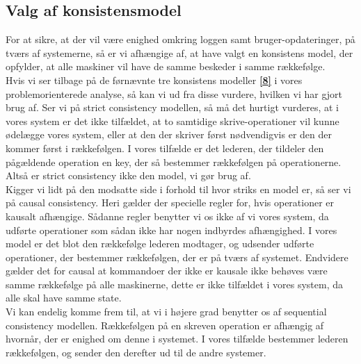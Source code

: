 \documentclass[a4paper,12pt]{article}
\begin{document}
\subsection{Valg af konsistensmodel}
For at sikre, at der vil være enighed omkring loggen samt bruger-opdateringer, på tværs af systemerne, så er vi afhængige af, at have valgt en konsistens model, der opfylder, at alle maskiner vil have de samme beskeder i samme rækkefølge.
\\[5px]
Hvis vi ser tilbage på de førnævnte tre konsistens modeller \hyperref[otte]{\textbf{[8]}} i vores problemorienterede analyse, så kan vi ud fra disse vurdere, hvilken vi har gjort brug af.
Ser vi på strict consistency modellen, så må det hurtigt vurderes, at i vores system er det ikke tilfældet, at to samtidige skrive-operationer vil kunne ødelægge vores system, eller at den der skriver først nødvendigvis er den der kommer først i rækkefølgen. I vores tilfælde er det lederen, der tildeler den pågældende operation en key, der så bestemmer rækkefølgen på operationerne.
Altså er strict consistency ikke den model, vi gør brug af.
\\[5px]
Kigger vi lidt på den modsatte side i forhold til hvor striks en model er, så ser vi på causal consistency. Heri gælder der specielle regler for, hvis operationer er kausalt afhængige. Sådanne regler benytter vi os ikke af vi vores system, da udførte operationer som sådan ikke har nogen indbyrdes afhængighed. I vores model er det blot den rækkefølge lederen modtager, og udsender udførte operationer, der bestemmer rækkefølgen, der er på tværs af systemet.
Endvidere gælder det for causal at kommandoer der ikke er kausale ikke behøves være samme rækkefølge på alle maskinerne, dette er ikke tilfældet i vores system, da alle skal have samme state.
\\[5px]
Vi kan endelig komme frem til, at vi i højere grad benytter os af sequential consistency modellen. Rækkefølgen på en skreven operation er afhængig af hvornår, der er enighed om denne i systemet. I vores tilfælde bestemmer lederen rækkefølgen, og sender den derefter ud til de andre systemer.
\end{document}
